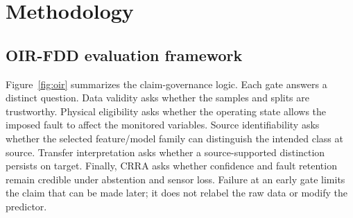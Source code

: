 \documentclass[preprint,12pt]{elsarticle}
\begin{document}
\section{Methodology}
\subsection{OIR-FDD evaluation framework}
Figure~\ref{fig:oir} summarizes the claim-governance logic. Each gate answers a distinct question. Data validity asks whether the samples and splits are trustworthy. Physical eligibility asks whether the operating state allows the imposed fault to affect the monitored variables. Source identifiability asks whether the selected feature/model family can distinguish the intended class at source. Transfer interpretation asks whether a source-supported distinction persists on target. Finally, CRRA asks whether confidence and fault retention remain credible under abstention and sensor loss. Failure at an early gate limits the claim that can be made later; it does not relabel the raw data or modify the predictor.
\end{document}
